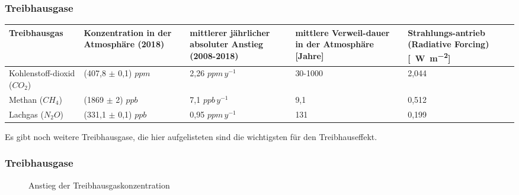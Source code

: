 \begin{frame}
	\frametitle{Treibhausgase}
	
	
	
	\begin{tabular}{p{2.5cm}|p{3cm}|p{3cm}|p{2cm}|p{2cm}}
		Treibhausgas & Konzentration in der Atmosphäre (2018) & mittlerer jährlicher absoluter Anstieg (2008-2018) & mittlere Verweil-dauer in der Atmosphäre [Jahre] & Strahlungs-antrieb (Radiative Forcing) [\SI{}{\watt\per\square\metre}] \\ 
		\hline 
		Kohlenstoff-dioxid ($CO_2$) & (407,8 $\pm$ 0,1) $ppm$ & 2,26 $ppm$\,$y^{-1}$ &  30-1000 & 2,044 \\ 
		\hline 
		Methan ($CH_4$) & (1869 $\pm$ 2) $ppb$ & 7,1 $ppb$\,$y^{-1}$ &9,1 & 0,512  \\ 
		\hline 
		Lachgas ($N_2O$) & (331,1 $\pm$ 0,1) $ppb$ & 0,95 $ppm$\,$y^{-1}$ & 131 & 0,199  \\ 
	\end{tabular} 
	Es gibt noch weitere Treibhausgase, die hier aufgelisteten sind die wichtigsten für den Treibhauseffekt.
	
\end{frame}

\begin{frame}
	\frametitle{Treibhausgase}
	\begin{figure}
		\caption{Anstieg der Treibhausgaskonzentration}
	\end{figure}
\end{frame}

